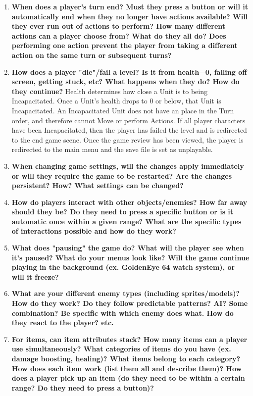 \documentclass[12pt, titlepage]{article}
\begin{document}
\begin{enumerate}
	\item \textbf{When does a player's turn end? Must they press a button or will it automatically end when they no longer have actions available? Will they ever run out of actions to perform? How many different actions can a player choose from? What do they all do? Does performing one action prevent the player from taking a different action on the same turn or subsequent turns?}

	\item \textbf{How does a player "die"/fail a level? Is it from health=0, falling off screen, getting stuck, etc? What happens when they do? How do they continue?}
	Health determines how close a Unit is to being Incapacitated. Once a Unit’s health drops to 0 or below, that Unit is Incapacitated. An Incapacitated Unit does not have an place in the Turn order, and therefore cannot Move or perform Actions. If all player characters have been Incapacitated, then the player has failed the level and is redirected to the end game scene. Once the game review has been viewed, the player is redirected to the main menu and the save file is set as unplayable.
	\item \textbf{When changing game settings, will the changes apply immediately or will they require the game to be restarted? Are the changes persistent? How? What settings can be changed?}

	\item \textbf{How do players interact with other objects/enemies? How far away should they be? Do they need to press a specific button or is it automatic once within a given range? What are the specific types of interactions possible and how do they work?}

	\item \textbf{What does "pausing" the game do? What will the player see when it's paused? What do your menus look like? Will the game continue playing in the background (ex. GoldenEye 64 watch system), or will it freeze?}

	\item \textbf{What are your different enemy types (including sprites/models)? How do they work? Do they follow predictable patterns? AI? Some combination? Be specific with which enemy does what. How do they react to the player? etc.}

	\item \textbf{For items, can item attributes stack? How many items can a player use simultaneously? What categories of items do you have (ex. damage boosting, healing)? What items belong to each category? How does each item work (list them all and describe them)? How does a player pick up an item (do they need to be within a certain range? Do they need to press a button)?}


\end{enumerate}
\end{document}

